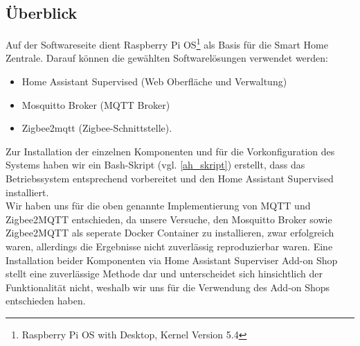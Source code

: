 \subsection{Überblick}\label{sw_ueberblick}
Auf der Softwareseite dient Raspberry Pi OS\footnote{Raspberry Pi OS with Desktop, Kernel Version 5.4} als Basis für die Smart Home Zentrale.
Darauf können die gewählten Softwarelösungen verwendet werden:
\begin{itemize}
    \item Home Assistant Supervised (Web Oberfläche und Verwaltung)
    \item Mosquitto Broker (MQTT Broker)
    \item Zigbee2mqtt (Zigbee-Schnittstelle).
\end{itemize}
\noindent Zur Installation der einzelnen Komponenten und für die Vorkonfiguration des Systems haben wir ein Bash-Skript (vgl. \ref{ah_skript}) erstellt, dass das Betriebssystem entsprechend vorbereitet und den Home Assistant Supervised installiert.\\
\noindent Wir haben uns für die oben genannte Implementierung von MQTT und Zigbee2MQTT entschieden, da unsere Versuche, den Mosquitto Broker sowie Zigbee2MQTT als seperate Docker Container zu installieren, zwar erfolgreich waren, allerdings die Ergebnisse nicht zuverlässig reproduzierbar waren. 
Eine Installation beider Komponenten via Home Assistant Superviser Add-on Shop stellt eine zuverlässige Methode dar und unterscheidet sich hinsichtlich der Funktionalität nicht, weshalb wir uns für die Verwendung des Add-on Shops entschieden haben.